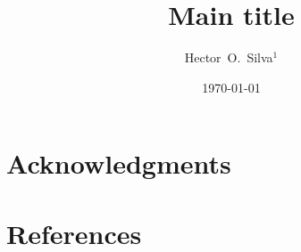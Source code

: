 \documentclass[12pt]{iopart}
\begin{document}
\title[Mini-title]{\sc Main title}

\author{\sc
Hector~O.~Silva$^{1}$
}

\address{$^{1}$~Max Planck Institute for Gravitational Physics (Albert Einstein Institute),
Am M\"uhlenberg 1, D-14476 Potsdam, Germany}

\date{\today}

\begin{abstract}
\end{abstract}

\maketitle


\section*{Acknowledgments}


\section*{References}


\end{document}
